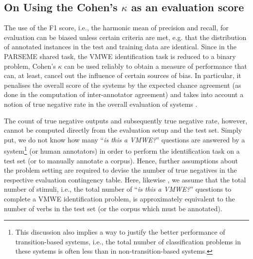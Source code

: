 \documentclass[output=paper
,modfonts
,nonflat,draftmode]{langsci/langscibook}
\begin{document}
\subsection{On Using the Cohen's $\kappa$ as an evaluation score}

The use of the F1 score, i.e., the harmonic mean of precision and recall, for evaluation can be biased unless certain criteria are met, e.g. that the distribution of annotated instances in the test and training data are identical. Since in the PARSEME shared task, the VMWE identification task is reduced to a binary  problem, Cohen's $\kappa$ can be used reliably to obtain a measure of performance that can, at least, cancel out the influence of certain sources of bias. In particular, it penalises the overall score of the systems by the expected chance agreement (as done in the computation of inter-annotator agreement) and takes into account a notion of true negative rate in the overall evaluation of systems \citep{Powers2012,Powers15}. 

The count of true negative outputs and subsequently true negative rate, however, cannot be computed directly from the evaluation setup and the test set. Simply put, we do not know how many ``\emph{is this a VMWE?}'' questions are answered by a system\footnote{This discussion also implies a way to justify the better performance of transition-based systems, i.e., the total number of classification problems in these systems is often less than in non-transition-based systems.} (or human annotators) in order to perform the identification task on a test set (or to manually annotate a corpus). Hence, further assumptions about the problem setting are required to devise the number of true negatives in the respective evaluation contingency table. Here, likewise \citep{MWEWorkshop}, we assume that the total number of stimuli, i.e., the total number of ``\emph{is this a VMWE?}'' questions to complete a VMWE identification problem, is approximately equivalent to the number of verbs in the test set (or the corpus which must be annotated).
\end{document}
